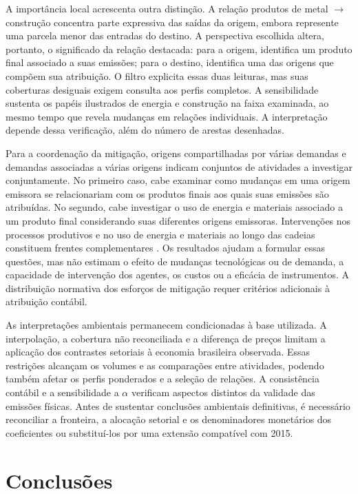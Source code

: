 \documentclass[12pt]{article}
\begin{document}
A importância local acrescenta outra distinção. A relação produtos de metal $\rightarrow$ construção concentra parte expressiva das saídas da origem, embora represente uma parcela menor das entradas do destino. A perspectiva escolhida altera, portanto, o significado da relação destacada: para a origem, identifica um produto final associado a suas emissões; para o destino, identifica uma das origens que compõem sua atribuição. O filtro explicita essas duas leituras, mas suas coberturas desiguais exigem consulta aos perfis completos. A sensibilidade sustenta os papéis ilustrados de energia e construção na faixa examinada, ao mesmo tempo que revela mudanças em relações individuais. A interpretação depende dessa verificação, além do número de arestas desenhadas.

Para a coordenação da mitigação, origens compartilhadas por várias demandas e demandas associadas a várias origens indicam conjuntos de atividades a investigar conjuntamente. No primeiro caso, cabe examinar como mudanças em uma origem emissora se relacionariam com os produtos finais aos quais suas emissões são atribuídas. No segundo, cabe investigar o uso de energia e materiais associado a um produto final considerando suas diferentes origens emissoras. Intervenções nos processos produtivos e no uso de energia e materiais ao longo das cadeias constituem frentes complementares \parencite{rissman2020}. Os resultados ajudam a formular essas questões, mas não estimam o efeito de mudanças tecnológicas ou de demanda, a capacidade de intervenção dos agentes, os custos ou a eficácia de instrumentos. A distribuição normativa dos esforços de mitigação requer critérios adicionais à atribuição contábil.

As interpretações ambientais permanecem condicionadas à base utilizada. A interpolação, a cobertura não reconciliada e a diferença de preços limitam a aplicação dos contrastes setoriais à economia brasileira observada. Essas restrições alcançam os volumes e as comparações entre atividades, podendo também afetar os perfis ponderados e a seleção de relações. A consistência contábil e a sensibilidade a $\alpha$ verificam aspectos distintos da validade das emissões físicas. Antes de sustentar conclusões ambientais definitivas, é necessário reconciliar a fronteira, a alocação setorial e os denominadores monetários dos coeficientes ou substituí-los por uma extensão compatível com 2015.

\clearpage
\section{Conclusões}
\end{document}

